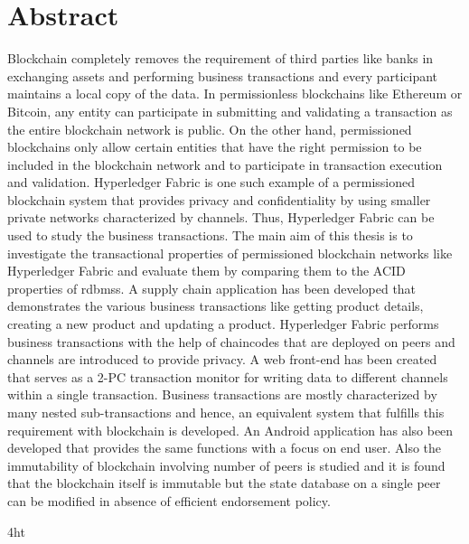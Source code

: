 \documentclass[
  a4paper,  %
  twoside,  %
  bibliography=totoc,
  headsepline,
  cleardoublepage=empty,
  parskip=half,
  draft=false
]{scrbook}
\begin{document}
  \section*{Abstract}
\fi
Blockchain completely removes the requirement of third parties like banks in exchanging assets and performing business transactions and every participant maintains a local copy of the data. In permissionless blockchains like Ethereum or Bitcoin, any entity can participate in submitting and validating a transaction as the entire blockchain network is public. On the other hand, permissioned blockchains only allow certain entities that have the right permission to be included in the blockchain network and to participate in transaction execution and validation. Hyperledger Fabric is one such example of a permissioned blockchain system that provides privacy and confidentiality by using smaller private networks characterized by channels. Thus, Hyperledger Fabric can be used to study the business transactions. \linebreak \linebreak
The main aim of this thesis is to investigate the transactional properties of permissioned blockchain networks like
Hyperledger Fabric and evaluate them by comparing them to the ACID properties of \glspl{rdbms}. A supply chain application has been developed that demonstrates the various business transactions like getting product details, creating a new product and updating a product. Hyperledger Fabric performs business transactions with the help of chaincodes that are deployed on peers and channels are introduced to provide privacy. A web front-end has been created that serves as a 2-PC transaction monitor for writing data to different channels within a single transaction. Business transactions are mostly characterized by many nested sub-transactions and hence, an equivalent system that fulfills this requirement with blockchain is developed. An Android application has also been developed that provides the same functions with a focus on end user.  Also the immutability of blockchain involving number of peers is studied and it is found that the blockchain itself is immutable but the state database on a single peer can be modified in absence of efficient endorsement policy. 

\cleardoublepage



\iftex4ht
\else
\fi

%
%
\end{document}
